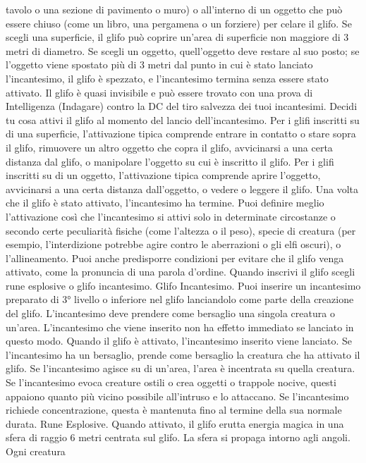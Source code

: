 \begin{multicols}{2}
tavolo o una sezione di pavimento o muro) o all’interno
di un oggetto che può essere chiuso (come un libro,
una pergamena o un forziere) per celare il glifo. Se
scegli una superficie, il glifo può coprire un’area di
superficie non maggiore di 3 metri di diametro. Se
scegli un oggetto, quell’oggetto deve restare al suo
posto; se l’oggetto viene spostato più di 3 metri dal
punto in cui è stato lanciato l’incantesimo, il glifo è
spezzato, e l’incantesimo termina senza essere stato
attivato.
Il glifo è quasi invisibile e può essere trovato con una
prova di Intelligenza (Indagare) contro la DC del tiro
salvezza dei tuoi incantesimi.
Decidi tu cosa attivi il glifo al momento del lancio
dell’incantesimo.
Per i glifi inscritti su di una superficie, l’attivazione tipica
comprende entrare in contatto o stare sopra il glifo,
rimuovere un altro oggetto che copra il glifo, avvicinarsi
a una certa distanza dal glifo, o manipolare l’oggetto su
cui è inscritto il glifo.
Per i glifi inscritti su di un oggetto, l’attivazione tipica
comprende aprire l’oggetto, avvicinarsi a una certa
distanza dall’oggetto, o vedere o leggere il glifo. Una
volta che il glifo è stato attivato, l’incantesimo ha
termine.
Puoi definire meglio l’attivazione così che l’incantesimo
si attivi solo in determinate circostanze o secondo certe
peculiarità fisiche (come l’altezza o il peso), specie di
creatura (per esempio, l’interdizione potrebbe agire
contro le aberrazioni o gli elfi oscuri), o l’allineamento.
Puoi anche predisporre condizioni per evitare che il glifo
venga attivato, come la pronuncia di una parola
d’ordine.
Quando inscrivi il glifo scegli rune esplosive o glifo
incantesimo.
Glifo Incantesimo. Puoi inserire un incantesimo
preparato di 3° livello o inferiore nel glifo lanciandolo
come parte della creazione del glifo. L’incantesimo
deve prendere come bersaglio una singola creatura o
un’area. L’incantesimo che viene inserito non ha effetto
immediato se lanciato in questo modo. Quando il glifo è
attivato, l’incantesimo inserito viene lanciato. Se
l’incantesimo ha un bersaglio, prende come bersaglio la
creatura che ha attivato il glifo. Se l’incantesimo agisce
su di un’area, l’area è incentrata su quella creatura. Se
l’incantesimo evoca creature ostili o crea oggetti o
trappole nocive, questi appaiono quanto più vicino
possibile all’intruso e lo attaccano. Se l’incantesimo
richiede concentrazione, questa è mantenuta fino al
termine della sua normale durata.
Rune Esplosive. Quando attivato, il glifo erutta energia
magica in una sfera di raggio 6 metri centrata sul glifo.
La sfera si propaga intorno agli angoli. Ogni creatura

\end{multicols}
